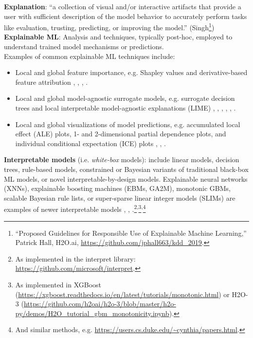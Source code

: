 \documentclass[sigconf]{acmart}
\begin{document}
\vspace{-8pt}
\noindent\textbf{Explanation}: ``a collection of visual and/or interactive artifacts that provide a user with sufficient description of the model behavior to accurately perform tasks like evaluation, trusting, predicting, or improving the model.'' (Singh\footnote{``Proposed Guidelines for Responsible Use of Explainable Machine Learning,'' Patrick Hall, H2O.ai, \url{https://github.com/jphall663/kdd_2019}.})\\

\vspace{-8pt}
\noindent\textbf{Explainable ML}:  Analysis and techniques, typically post-hoc, employed to understand trained model mechanisms or predictions.\\

\vspace{-8pt}
\noindent Examples of common explainable ML techniques include:
\begin{itemize}
\item Local and global feature importance, e.g. Shapley values and derivative-based feature attribution \cite{grad_attr} \cite{keinan2004fair}, \cite{shapley}, \cite{shapley1988shapley}, \cite{kononenko2010efficient}.
\item Local and global model-agnostic surrogate models, e.g. surrogate decision trees and local interpretable model-agnostic explanations (LIME) \cite{dt_surrogate2}, \cite{viper}, \cite{dt_surrogate1}, \cite{lime-sup}, \cite{lime}, \cite{wf_xnn}. 
\item Local and global visualizations of model predictions, e.g. accumulated local effect (ALE) plots, 1- and 2-dimensional partial dependence plots, and individual conditional expectation (ICE) plots \cite{ale_plot}, \cite{esl}, \cite{ice_plots}.
\end{itemize}  

\noindent\textbf{Interpretable models} (i.e. \textit{white-box} models): include linear models, decision trees, rule-based models, constrained or Bayesian variants of traditional black-box ML models, or novel interpretable-by-design models. Explainable neural networks (XNNs), explainable boosting machines (EBMs, GA2M), monotonic GBMs, scalable Bayesian rule lists, or super-sparse linear integer models (SLIMs) are examples of newer interpretable models \cite{slim}, \cite{wf_xnn}, \cite{sbrl}.\footnote{As implemented in the interpret library: \url{https://github.com/microsoft/interpret}.}\textsuperscript{,}\footnote{As implemented in XGBoost (\url{https://xgboost.readthedocs.io/en/latest/tutorials/monotonic.html}) or H2O-3 (\url{https://github.com/h2oai/h2o-3/blob/master/h2o-py/demos/H2O_tutorial_gbm_monotonicity.ipynb}).}\textsuperscript{,}\footnote{And similar methods, e.g. \url{https://users.cs.duke.edu/~cynthia/papers.html}.}\\
\end{document}
